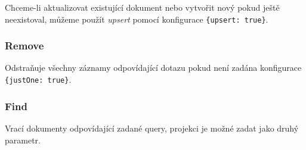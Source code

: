 Chceme-li aktualizovat existující dokument nebo vytvořit nový pokud ještě neexistoval, můžeme použít \textit{upsert} pomocí konfigurace \texttt{\{upsert: true\}}.

\subsubsection*{Remove}

Odstraňuje všechny záznamy odpovídající dotazu pokud není zadána konfigurace \texttt{\{justOne: true\}}.

\subsubsection*{Find}

Vrací dokumenty odpovídající zadané query, projekci je možné zadat jako druhý parametr.
